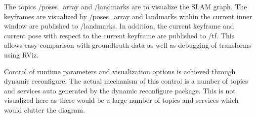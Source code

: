 The topics /poses\_array and /landmarks are to visualize the SLAM graph.  The keyframes are visualized by /poses\_array and landmarks within the current inner window are published to /landmarks.  In addition, the current keyframe and current pose with respect to the current keyframe are published to /tf.  This allows easy comparison with groundtruth data as well as debugging of transforms using RViz.

Control of runtime parameters and visualization options is achieved through dynamic reconfigure.  The actual mechanism of this control is a number of topics and services auto generated by the dynamic reconfigure package.  This is not visualized here as there would be a large number of topics and services which would clutter the diagram.

